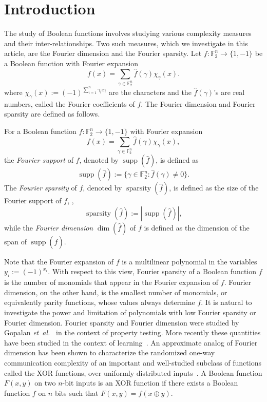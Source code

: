 \documentclass{toc}
\DeclareMathOperator{\Supp}{supp}
\DeclareMathOperator{\spa}{sparsity}
\DeclareMathOperator{\dimn}{dim}
\newcommand{\etal}{{\it et~al.}}
\begin{document}
\section{Introduction}
\label{intro}
The study of Boolean functions involves studying various complexity measures and their inter-relation\-ships. Two such measures,
which we investigate in this article, are the Fourier dimension and
the Fourier sparsity. Let
$f:\mathbb{F}_2^n \to \{1,-1\}$ be a Boolean function with Fourier expansion
\[f(x)=\sum_{\gamma \in \mathbb{F}_2^n}\widehat{f}(\gamma) \chi_\gamma(x).\]
where $\chi_\gamma(x):=(-1)^{\sum_{i=1}^n \gamma_ix_i}$ are the characters and the $\widehat{f}(\gamma)$'s are real numbers, called the Fourier coefficients of $f$.
The Fourier dimension and Fourier sparsity are defined as follows.
\begin{definition}
 For a Boolean function $f:\mathbb{F}_2^n \to \{1,-1\}$ with Fourier expansion
\[f(x)=\sum_{\gamma \in \mathbb{F}_2^n}\widehat{f}(\gamma)
\chi_\gamma(x),\] the \emph{Fourier support} of $f$, denoted by $\Supp(\widehat{f})$,
is defined as 
\[\Supp(\widehat{f}) := \{\gamma \in \mathbb{F}_2^n: \widehat{f}(\gamma) \neq 0\}.\]
The \emph{Fourier sparsity} of $f$, denoted by $\spa(\widehat{f})$, is defined as the size of the Fourier support of $f$,
\ie, 
\[\spa(\widehat{f}) :=|\Supp(\widehat{f})|,\]
while the \emph{Fourier dimension} $\dimn(\widehat{f})$ of $f$ is defined as the
dimension of the span of $\Supp(\widehat{f})$.
\end{definition}
Note that the Fourier expansion of $f$ is a
%
multilinear   %
polynomial in the variables $y_i:=(-1)^{x_i}$. With respect to this view, Fourier sparsity of a Boolean function $f$ is the number of monomials that appear in the Fourier expansion of $f$. Fourier dimension, on the other hand, is the smallest number of monomials, or equivalently parity functions, whose values always determine $f$. It is natural to investigate the power and limitation of polynomials with low Fourier sparsity or Fourier dimension. Fourier sparsity and Fourier dimension were studied by Gopalan \etal~\cite{DBLP:journals/siamcomp/GopalanOSSW11} in the context of property testing. More recently these quantities have been studied in the context of learning~\cite{DBLP:journals/toct/HavivR16, DBLP:journals/corr/abs-1810-00481}. An approximate analog of Fourier dimension has been shown to characterize the randomized one-way communication complexity of an important and well-studied subclass of functions called the XOR functions, over uniformly distributed inputs~\cite{DBLP:conf/coco/KannanMSY18}. A Boolean function $F(x,y)$ on two $n$-bit inputs is an XOR function if there exists a Boolean function $f$ on $n$ bits such that
$F(x,y)=f(x \oplus y)$. %
\end{document}
